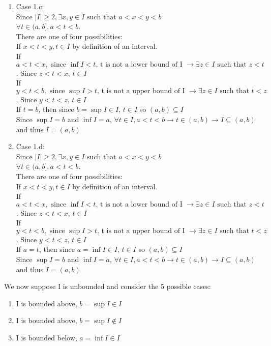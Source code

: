 \documentclass[12pt]{article}
\begin{document}
\begin{enumerate}
\begin{enumerate}
\item Case 1.c:\\
Since $|I| \geq 2, \exists x,y\in I \text{ such that } a<x<y<b$\\
$\forall t\in (a,b], a<t<b$.  \\
There are one of four possibilities:\\
If $x<t<y, t\in I$ by definition of an interval.\\
If $a < t < x, \text{ since $\inf I < t$, t is not a lower bound of I } \rightarrow \exists z\in I \text{ such that } z < t$.  Since $z<t<x$, $t\in I$\\
If $y < t < b, \text{ since $\sup I > t$, t is not a upper bound of I } \rightarrow \exists z\in I \text{ such that } t < z$.  Since $y<t<z$, $t\in I$\\
If $t=b$, then since $b = \sup I \in I$, $t\in I$
so $(a,b) \subseteq I$\\
Since $\sup I = b$ and $\inf I = a$, $\forall t\in I, a<t<b \rightarrow t\in (a,b) \rightarrow I \subseteq (a,b)$ and thus $I=(a,b)$
\item Case 1.d:\\
Since $|I| \geq 2, \exists x,y\in I \text{ such that } a<x<y<b$\\
$\forall t\in (a,b], a<t<b$.  \\
There are one of four possibilities:\\
If $x<t<y, t\in I$ by definition of an interval.\\
If $a < t < x, \text{ since $\inf I < t$, t is not a lower bound of I } \rightarrow \exists z\in I \text{ such that } z < t$.  Since $z<t<x$, $t\in I$\\
If $y < t < b, \text{ since $\sup I > t$, t is not a upper bound of I } \rightarrow \exists z\in I \text{ such that } t < z$.  Since $y<t<z$, $t\in I$\\
If $a=t$, then since $a = \inf I \in I$, $t\in I$
so $(a,b) \subseteq I$\\
Since $\sup I = b$ and $\inf I = a$, $\forall t\in I, a<t<b \rightarrow t\in (a,b) \rightarrow I \subseteq (a,b)$ and thus $I=(a,b)$\\
\end{enumerate}
We now suppose I is unbounded and consider the 5 possible cases:
\begin{enumerate}
\item I is bounded above, $b = \sup I \in I$
\item I is bounded above, $b = \sup I \notin I$
\item I is bounded below, $a = \inf I \in I$

\end{enumerate}
\end{enumerate}
\end{document}

